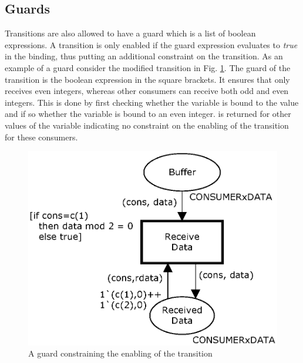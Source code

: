 \subsection{Guards}
\label{subsec:guards}
Transitions are also allowed to have a guard which is a list of boolean expressions. A transition is only enabled if the guard expression evaluates to \emph{true} in the binding, thus putting an additional constraint on the transition. As an example of a guard consider the modified transition  in Fig. \ref{fig:partsystemwithguard}. The guard of the transition  is the boolean expression in the square brackets. It ensures that  only receives even integers, whereas other consumers can receive both odd and even integers. This is done by first checking whether the  variable is bound to the value  and if so whether the variable  is bound to an even integer.  is returned for other values of the  variable indicating no constraint on the enabling of the transition for these consumers.

\begin{figure}
\centering
\includegraphics[scale=0.35]{background/graphics/PartSystemWithGuard.eps}
\caption{A guard constraining the enabling of the transition }
\label{fig:partsystemwithguard}
\end{figure}
